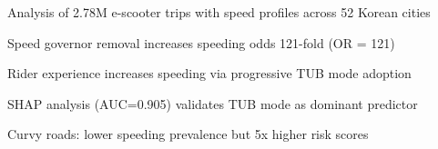 \begin{highlights}
\item Analysis of 2.78M e-scooter trips with speed profiles across 52 Korean cities
\item Speed governor removal increases speeding odds 121-fold (OR = 121)
\item Rider experience increases speeding via progressive TUB mode adoption
\item SHAP analysis (AUC=0.905) validates TUB mode as dominant predictor
\item Curvy roads: lower speeding prevalence but 5x higher risk scores
\end{highlights}
